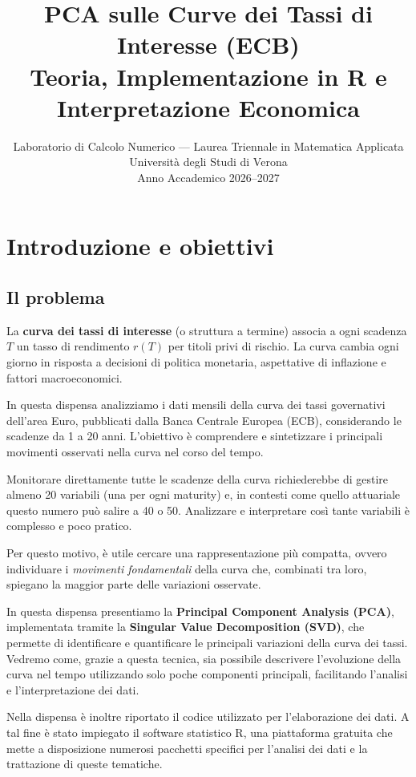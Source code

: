 \documentclass[11pt,a4paper]{article}
\title{%
  \textbf{PCA sulle Curve dei Tassi di Interesse (ECB)}\\[6pt]
  \large Teoria, Implementazione in R e Interpretazione Economica\\[4pt]
}
\author{Laboratorio di Calcolo Numerico --- Laurea Triennale in Matematica Applicata\\
  Universit\`a degli Studi di Verona\\[2pt]
  Anno Accademico 2026--2027}
\date{}
\theoremstyle{plain}
\theoremstyle{definition}
\theoremstyle{remark}
\begin{document}
\maketitle
\tableofcontents
\newpage

\section{Introduzione e obiettivi}

\subsection{Il problema}

La \textbf{curva dei tassi di interesse} (o struttura a termine) associa a ogni
scadenza $T$ un tasso di rendimento $r(T)$ per titoli privi di rischio. La curva
cambia ogni giorno in risposta a decisioni di politica monetaria, aspettative di
inflazione e fattori macroeconomici.

In questa dispensa analizziamo i dati mensili della curva dei tassi governativi dell'area Euro, pubblicati dalla Banca Centrale Europea (ECB), considerando le scadenze da 1 a 20 anni. L'obiettivo è comprendere e sintetizzare i principali movimenti osservati nella curva nel corso del tempo.

Monitorare direttamente tutte le scadenze della curva richiederebbe di gestire almeno 20 variabili (una per ogni maturity) e, in contesti come quello attuariale questo numero può salire a 40 o 50. Analizzare e interpretare così tante variabili è complesso e poco pratico.

Per questo motivo, è utile cercare una rappresentazione più compatta, ovvero individuare i \emph{movimenti fondamentali} della curva che, combinati tra loro, spiegano la maggior parte delle variazioni osservate. 

In questa dispensa presentiamo la \textbf{Principal Component Analysis (PCA)}, implementata tramite la \textbf{Singular Value Decomposition (SVD)}, che permette di identificare e quantificare le principali variazioni della curva dei tassi. Vedremo come, grazie a questa tecnica, sia possibile descrivere l'evoluzione della curva nel tempo utilizzando solo poche componenti principali, facilitando l'analisi e l'interpretazione dei dati.

Nella dispensa è inoltre riportato il codice utilizzato per l’elaborazione dei dati. A tal fine è stato impiegato il software statistico R, una piattaforma gratuita che mette a disposizione numerosi pacchetti specifici per l’analisi dei dati e la trattazione di queste tematiche.
\end{document}

